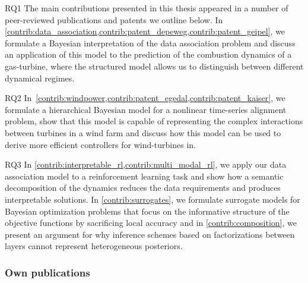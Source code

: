 \begin{compactdesc}
    \item[RQ1]
    The main contributions presented in this thesis appeared in a number of peer-reviewed publications and patents we outline below.
    In \cref{contrib:data_association,contrib:patent_depeweg,contrib:patent_geipel}, we formulate a Bayesian interpretation of the data association problem and discuss an application of this model to the prediction of the combustion dynamics of a gas-turbine, where the structured model allows us to distinguish between different dynamical regimes.
    \item[RQ2]
    In~\cref{contrib:windpower,contrib:patent_egedal,contrib:patent_kaiser}, we formulate a hierarchical Bayesian model for a nonlinear time-series alignment problem, show that this model is capable of representing the complex interactions between turbines in a wind farm and discuss how this model can be used to derive more efficient controllers for wind-turbines in.
    \item[RQ3]
    In \cref{contrib:interpretable_rl,contrib:multi_modal_rl}, we apply our data association model to a reinforcement learning task and show how a semantic decomposition of the dynamics reduces the data requirements and produces interpretable solutions.
    In \cref{contrib:surrogates}, we formulate surrogate models for Bayesian optimization problems that focus on the informative structure of the objective functions by sacrificing local accuracy and in \cref{contrib:composition}, we present an argument for why inference schemes based on factorizations between layers cannot represent heterogeneous posteriors.
\end{compactdesc}


\subsubsection{Own publications}

